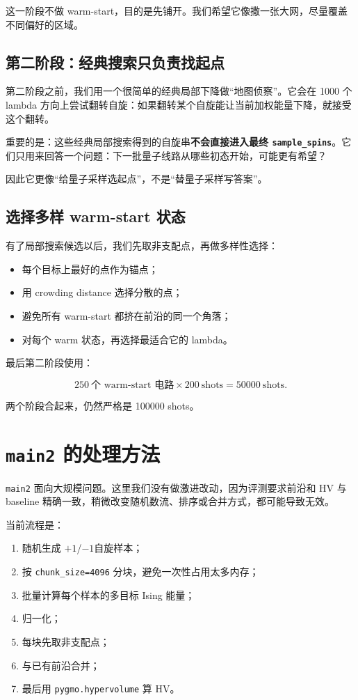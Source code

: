\documentclass[UTF8,zihao=-4]{ctexart}
\newcommand{\code}[1]{\texttt{#1}}
\newcommand{\plusone}{\ensuremath{+1}}
\newcommand{\minusone}{\ensuremath{-1}}
\begin{document}
这一阶段不做 warm-start，目的是先铺开。我们希望它像撒一张大网，尽量覆盖不同偏好的区域。

\subsection{第二阶段：经典搜索只负责找起点}

第二阶段之前，我们用一个很简单的经典局部下降做“地图侦察”。它会在 1000 个 lambda 方向上尝试翻转自旋：如果翻转某个自旋能让当前加权能量下降，就接受这个翻转。

重要的是：这些经典局部搜索得到的自旋串\textbf{不会直接进入最终 \code{sample\_spins}}。它们只用来回答一个问题：下一批量子线路从哪些初态开始，可能更有希望？

因此它更像“给量子采样选起点”，不是“替量子采样写答案”。

\subsection{选择多样 warm-start 状态}

有了局部搜索候选以后，我们先取非支配点，再做多样性选择：

\begin{itemize}
  \item 每个目标上最好的点作为锚点；
  \item 用 crowding distance 选择分散的点；
  \item 避免所有 warm-start 都挤在前沿的同一个角落；
  \item 对每个 warm 状态，再选择最适合它的 lambda。
\end{itemize}

最后第二阶段使用：

\[
250\ \text{个 warm-start 电路}\times 200\ \text{shots}=50000\ \text{shots}.
\]

两个阶段合起来，仍然严格是 100000 shots。

\section{\code{main2} 的处理方法}

\code{main2} 面向大规模问题。这里我们没有做激进改动，因为评测要求前沿和 HV 与 baseline 精确一致，稍微改变随机数流、排序或合并方式，都可能导致无效。

当前流程是：

\begin{enumerate}
  \item 随机生成 \plusone/\minusone 自旋样本；
  \item 按 \code{chunk\_size=4096} 分块，避免一次性占用太多内存；
  \item 批量计算每个样本的多目标 Ising 能量；
  \item 归一化；
  \item 每块先取非支配点；
  \item 与已有前沿合并；
  \item 最后用 \code{pygmo.hypervolume} 算 HV。
\end{enumerate}
\end{document}
